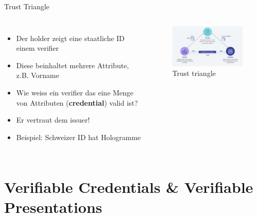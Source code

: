 \documentclass[
	german,%
	authorontitle=true,
	]{bfhbeamer}
\begin{document}
\begin{frame}{Trust Triangle}
    \begin{columns}[onlytextwidth,T]
        \column{70mm}  
        \begin{itemize}
            \item Der holder zeigt eine staatliche ID einem verifier
            \item Diese beinhaltet mehrere Attribute, z.B. Vorname
            \item Wie weiss ein verifier das eine Menge von Attributen (\textbf{credential}) valid ist?
            \item Er vertraut dem issuer!
            \item Beispiel: Schweizer ID hat Hologramme
        \end{itemize}

        \column{70mm}

        \begin{figure}
            \centering
            \includegraphics[width=70mm]{../img/trusttriangle.png}
            \caption{Trust triangle}
        \end{figure}
        
    \end{columns}
\end{frame}

\section{Verifiable Credentials \& Verifiable Presentations}
\end{document}
